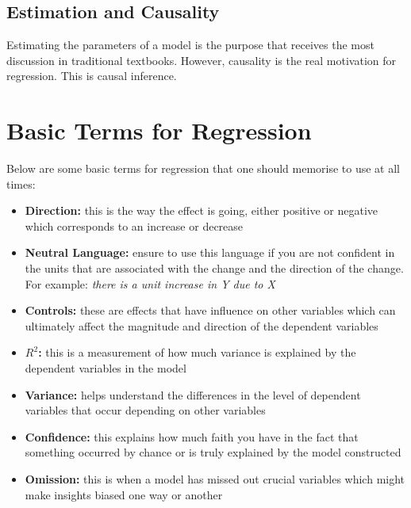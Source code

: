 \documentclass[12pt, letterpaper]{article}
\begin{document}
\subsection{Estimation and Causality}
Estimating the parameters of a model is the purpose that receives the most discussion in traditional textbooks. However, causality is the real motivation for regression. This is causal inference.

\section{Basic Terms for Regression}
Below are some basic terms for regression that one should memorise to use at all times:
\begin{itemize}
	\item \textbf{Direction:} this is the way the effect is going, either positive or negative which corresponds to an increase or decrease
	\item \textbf{Neutral Language:} ensure to use this language if you are not confident in the units that are associated with the change and the direction of the change. For example: \textit{there is a unit increase in Y due to X}
	\item \textbf{Controls:} these are effects that have influence on other variables which can ultimately affect the magnitude and direction of the dependent variables
	\item \textbf{$R^2$:} this is a measurement of how much variance is explained by the dependent variables in the model
	\item \textbf{Variance:} helps understand the differences in the level of dependent variables that occur depending on other variables
	\item \textbf{Confidence:} this explains how much faith you have in the fact that something occurred by chance or is truly explained by the model constructed
	\item \textbf{Omission:} this is when a model has missed out crucial variables which might make insights biased one way or another
\end{itemize}
\end{document}
